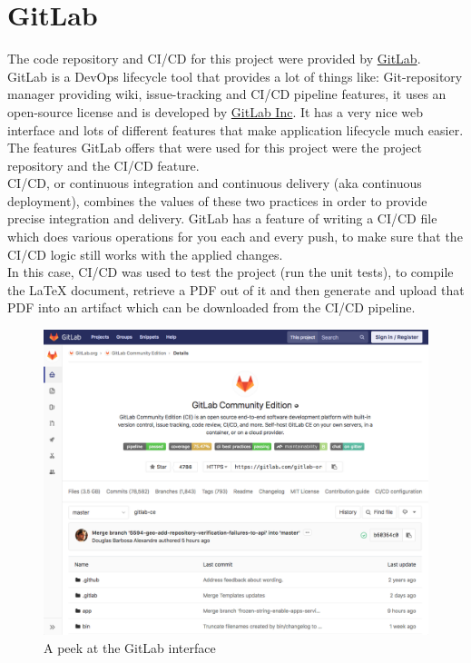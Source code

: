 \section{GitLab}
The code repository and CI/CD for this project were provided by \href{https://gitlab.com/}{GitLab}.\\
GitLab is a DevOps lifecycle tool that provides a lot of things like: Git-repository manager providing wiki, issue-tracking and CI/CD pipeline features, it uses an open-source license and is developed by \href{https://about.gitlab.com/company/}{GitLab Inc}.
It has a very nice web interface and lots of different features that make application lifecycle much easier. The features GitLab offers that were used for this project were the project repository and the CI/CD feature.\\
\newline
CI/CD, or continuous integration and continuous delivery (aka continuous deployment), combines the values of these two practices in order to provide precise integration and delivery.
GitLab has a feature of writing a CI/CD file which does various operations for you each and every push, to make sure that the CI/CD logic still works with the applied changes.\\
In this case, CI/CD was used to test the project (run the unit tests), to compile the LaTeX document, retrieve a PDF out of it and then generate and upload that PDF into an artifact which can be downloaded from the CI/CD pipeline.
\begin{figure}[H]
	\includegraphics[width=\linewidth]{Images/Implementation/gitlab_view.png}
	\caption{A peek at the GitLab interface}
\end{figure}	
